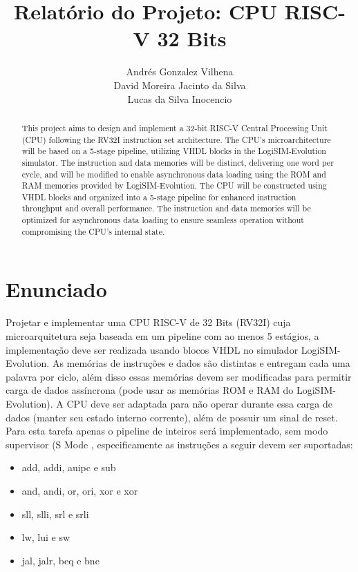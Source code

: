 \documentclass[12pt]{article}
\title{Relatório do Projeto: CPU RISC-V 32 Bits}
\author{Andrés Gonzalez Vilhena\\
        David Moreira Jacinto da Silva\\
        Lucas da Silva Inocencio}
\begin{document}
\maketitle

\begin{abstract}
This project aims to design and implement a 32-bit RISC-V Central Processing Unit (CPU) following the RV32I instruction set architecture. The CPU's microarchitecture will be based on a 5-stage pipeline, utilizing VHDL blocks in the LogiSIM-Evolution simulator. The instruction and data memories will be distinct, delivering one word per cycle, and will be modified to enable asynchronous data loading using the ROM and RAM memories provided by LogiSIM-Evolution. The CPU will be constructed using VHDL blocks and organized into a 5-stage pipeline for enhanced instruction throughput and overall performance. The instruction and data memories will be optimized for asynchronous data loading to ensure seamless operation without compromising the CPU's internal state.
\end{abstract}

\section{Enunciado}

Projetar e implementar uma CPU RISC-V de 32 Bits (RV32I) cuja microarquitetura seja baseada em um pipeline com ao menos 5 estágios, a implementação deve ser realizada usando blocos VHDL no simulador LogiSIM-Evolution. As memórias de instruções e dados são distintas e entregam cada uma palavra por ciclo, além disso essas memórias devem ser modificadas para permitir carga de dados assíncrona (pode usar as memórias ROM e RAM do LogiSIM-Evolution). A CPU deve ser adaptada para não operar durante essa carga de dados (manter seu estado interno corrente), além de possuir um sinal de reset. Para esta tarefa apenas o pipeline de inteiros será implementado, sem modo supervisor (S Mode , especificamente as instruções a seguir devem ser suportadas:

\begin{itemize}
    \item add, addi, auipc e sub
    \item and, andi, or, ori, xor e xor
    \item sll, slli, srl e srli
    \item lw, lui e sw
    \item jal, jalr, beq e bne
\end{itemize}
\end{document}

